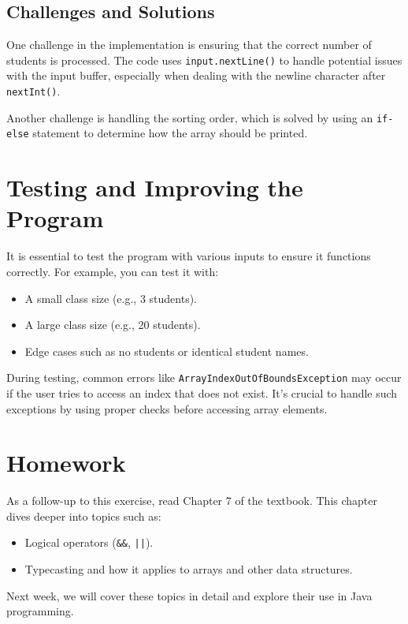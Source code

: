 \documentclass{article}
\begin{document}
\subsection{Challenges and Solutions}
One challenge in the implementation is ensuring that the correct number of students is processed. The code uses \texttt{input.nextLine()} to handle potential issues with the input buffer, especially when dealing with the newline character after \texttt{nextInt()}.

Another challenge is handling the sorting order, which is solved by using an \texttt{if-else} statement to determine how the array should be printed.

\section{Testing and Improving the Program}
It is essential to test the program with various inputs to ensure it functions correctly. For example, you can test it with:
\begin{itemize}
    \item A small class size (e.g., 3 students).
    \item A large class size (e.g., 20 students).
    \item Edge cases such as no students or identical student names.
\end{itemize}

During testing, common errors like \texttt{ArrayIndexOutOfBoundsException} may occur if the user tries to access an index that does not exist. It’s crucial to handle such exceptions by using proper checks before accessing array elements.

\section{Homework}
As a follow-up to this exercise, read Chapter 7 of the textbook. This chapter dives deeper into topics such as:
\begin{itemize}
    \item Logical operators (\texttt{\&\&}, \texttt{||}).
    \item Typecasting and how it applies to arrays and other data structures.
\end{itemize}

Next week, we will cover these topics in detail and explore their use in Java programming.
\end{document}
